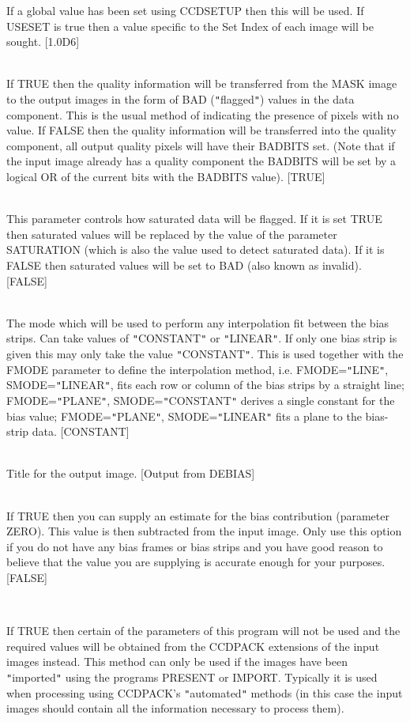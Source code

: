 \documentclass[twoside,11pt]{article}
\newcommand{\htmlref}[2]{#1}
\newcommand{\xlabel}[1]{}
\renewcommand{\_}{\texttt{\symbol{95}}}
\newcommand{\qt}[1]{{\tt "}#1{\tt "}}
\newcommand{\routine}[1]{{\sc #1}}
\newcommand{\xroutine}[1]{\htmlref{{\sc #1}}{#1}}
\newcommand{\sstsubsection}[1]{ \item[{#1}] \mbox{} \\}
\newcommand{\sstsubsection}[1]{\item[{#1}]}
\begin{document}
{{{         If a global value has been set using \routine{CCDSETUP} then this will
         be used.   If USESET is true then a value specific to the
         Set Index of each image will be sought.
         [1.0D6]
      }
      \sstsubsection{
         SETBAD = \_LOGICAL (Read)
      } {
         If TRUE then the quality information will be transferred
         from the MASK image to the output images in the form of BAD
         (\qt{flagged}) values in the data component. This is the usual
         method of indicating the presence of pixels with no value. If
         FALSE then the quality information will be transferred into
         the quality component, all output quality pixels will have
         their BADBITS set. (Note that if the input image already has a
         quality component the BADBITS will be set by a logical OR of
         the current bits with the BADBITS value).
         [TRUE]
      }
      \sstsubsection{
         SETSAT = \_LOGICAL (Read)
      } {
         This parameter controls how saturated data will be flagged.
         If it is set TRUE then saturated values will be replaced by
         the value of the parameter SATURATION (which is also the value
         used to detect saturated data). If it is FALSE then saturated
         values will be set to BAD (also known as invalid).
         [FALSE]
      }
      \sstsubsection{
         SMODE = LITERAL (Read)
      } {
         The mode which will be used to perform any interpolation fit
         between the bias strips. Can take values of \qt{CONSTANT} or
         \qt{LINEAR}. If only one bias strip is given this may only take
         the value \qt{CONSTANT}. This is used together with the FMODE
         parameter to define the interpolation method, i.e.
         FMODE=\qt{LINE}, SMODE=\qt{LINEAR}, fits each row or column of the
         bias strips by a straight line; FMODE=\qt{PLANE},
         SMODE=\qt{CONSTANT} derives a single constant for the bias value;
         FMODE=\qt{PLANE}, SMODE=\qt{LINEAR} fits a plane to the bias-strip
         data.
         [CONSTANT]
      }
      \sstsubsection{
         TITLE = LITERAL (Read)
      } {
         Title for the output image.
         [Output from DEBIAS]
      }
      \sstsubsection{
         USECON = \_LOGICAL (Read) \xlabel{CCDbiaslevel}
      } {
         If TRUE then you can supply an estimate for the bias
         contribution (parameter ZERO). This value is then subtracted
         from the input image. Only use this option if you do not have
         any bias frames or bias strips and you have good reason to
         believe that the value you are supplying is accurate enough
         for your purposes.
         [FALSE]
      }
      \sstsubsection{
         USEEXT = \_LOGICAL (Read)
      } {
         If TRUE then certain of the parameters of this program will not
         be used and the required values will be obtained from the
         CCDPACK extensions of the input images instead. This method can
         only be used if the images have been \qt{imported} using the
         programs \xroutine{PRESENT} or \xroutine{IMPORT}. Typically it is used when
         processing using CCDPACK's \qt{automated} methods (in this case
         the input images should contain all the information necessary to
         process them).

}}}
\end{document}
